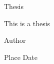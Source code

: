 \thispagestyle{empty}
\begin{center}
\LARGE{Thesis}

\vspace{0.2\textheight}
\large{This is a thesis}

\vspace{0.2\textheight}
\large{Author}

\vspace{0.2\textheight}
\large{Place Date}
\end{center}

\newpage
\thispagestyle{empty}

\newpage
\thispagestyle{empty}

\vspace*{\fill}

